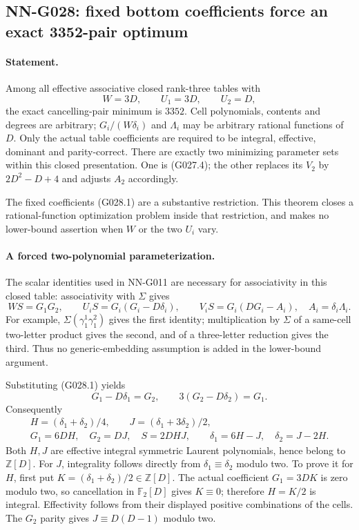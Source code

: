 \subsection{NN-G028: fixed bottom coefficients force an exact 3352-pair optimum}
\paragraph{Statement.}
Among all effective associative closed rank-three tables with
\[
 W=3D,\qquad U_1=3D,\qquad U_2=D,                    \tag{G028.1}
\]
the exact cancelling-pair minimum is $3352$.
Cell polynomials, contents and degrees are arbitrary;
$G_i/(W\delta_i)$ and $\Lambda_i$ may be arbitrary
rational functions of $D$. Only the actual table
coefficients are required to be integral, effective,
dominant and parity-correct. There are exactly two
minimizing parameter sets within this closed presentation.
One is (G027.4); the other replaces its $V_2$ by
$2D^2-D+4$ and adjusts $A_2$ accordingly.

The fixed coefficients (G028.1) are a substantive
restriction. This theorem closes a rational-function
optimization problem inside that restriction, and
makes no lower-bound assertion when $W$ or the two
$U_i$ vary.

\paragraph{A forced two-polynomial parameterization.}
The scalar identities used in NN-G011 are necessary
for associativity in this closed table: associativity
with $\Sigma$ gives
\[
 WS=G_1G_2,\qquad U_iS=G_i(G_i-D\delta_i),\qquad
 V_iS=G_i(DG_i-A_i),\quad A_i=\delta_i\Lambda_i.
\]
For example, $\Sigma(\gamma_1^1\gamma_1^2)$ gives
the first identity; multiplication by $\Sigma$ of
a same-cell two-letter product gives the second,
and of a three-letter reduction gives the third.
Thus no generic-embedding assumption is added in
the lower-bound argument.

Substituting (G028.1) yields
\[
 G_1-D\delta_1=G_2,\qquad
 3(G_2-D\delta_2)=G_1.
\]
Consequently
\[
 \begin{gathered}
 H=(\delta_1+\delta_2)/4,\qquad
 J=(\delta_1+3\delta_2)/2,\\
 G_1=6DH,\quad G_2=DJ,\quad S=2DHJ,\qquad
 \delta_1=6H-J,\quad\delta_2=J-2H.                 \end{gathered}\tag{G028.2}
\]
Both $H,J$ are effective integral symmetric Laurent
polynomials, hence belong to $\mathbb Z[D]$.
For $J$, integrality follows directly from
$\delta_1\equiv\delta_2$ modulo two. To prove it for
$H$, first put $K=(\delta_1+\delta_2)/2\in\mathbb Z[D]$.
The actual coefficient $G_1=3DK$ is zero modulo two,
so cancellation in $\mathbb F_2[D]$ gives $K\equiv0$;
therefore $H=K/2$ is integral. Effectivity follows
from their displayed positive combinations of the cells.
The $G_2$ parity gives $J\equiv D(D-1)$ modulo two.

